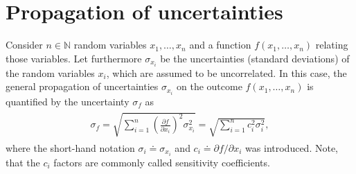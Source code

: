 \documentclass[a4paper,11pt, twocolumn]{article}
\begin{document}
\section{Propagation of uncertainties}
Consider $n \in \mathbb{N}$ random variables $x_1,\dots,x_n$ and a function $f(x_1,\dots,x_n)$ relating those variables. Let furthermore $\sigma_{x_i}$ be the uncertainties (standard deviations) of the random variables $x_i$, which are assumed to be uncorrelated. In this case, the general propagation of uncertainties $\sigma_{x_i}$ on the outcome $f(x_1,\dots,x_n)$ is quantified by the uncertainty $\sigma_f$ as \begin{gather}\label{eq:generallawpropagationofuncertainties}
		\begin{gathered}\sigma_f = \sqrt{\sum_{i=1}^{n}\left(\frac{\partial f}{\partial x_i}\right)^2 \sigma_{x_i}^2} = \sqrt{\sum_{i=1}^{n}c_i^2 \sigma_{i}^2},
\end{gathered}\end{gather} where the short-hand notation $\sigma_i \doteq \sigma_{x_i}$ and $c_i \doteq \partial f/\partial x_i$ was introduced. Note, that the $c_i$ factors are commonly called sensitivity coefficients.





\end{document}
